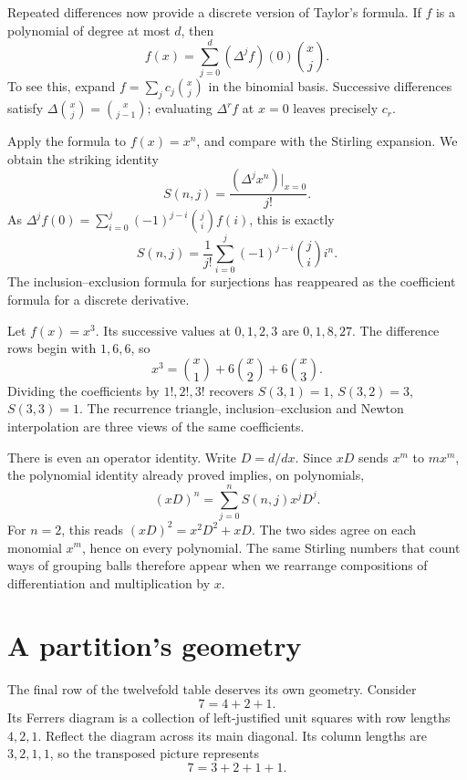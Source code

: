 Repeated differences now provide a discrete version of Taylor's formula. If \(f\) is a polynomial of degree at most \(d\), then
\[
 \boxed{f(x)=\sum_{j=0}^d(\Delta^jf)(0)\binom{x}{j}.}
\]
To see this, expand \(f=\sum_jc_j\binom{x}{j}\) in the binomial basis. Successive differences satisfy \(\Delta\binom{x}{j}=\binom{x}{j-1}\); evaluating \(\Delta^rf\) at \(x=0\) leaves precisely \(c_r\).

Apply the formula to \(f(x)=x^n\), and compare with the Stirling expansion. We obtain the striking identity
\[
 \boxed{S(n,j)=\frac{(\Delta^j x^n)|_{x=0}}{j!}.}
\]
As \(\Delta^j f(0)=\sum_{i=0}^j(-1)^{j-i}\binom ji f(i)\), this is exactly
\[
 S(n,j)=\frac1{j!}
 \sum_{i=0}^j(-1)^{j-i}\binom ji i^n.
\]
The inclusion--exclusion formula for surjections has reappeared as the coefficient formula for a discrete derivative.

\begin{example}
Let \(f(x)=x^3\). Its successive values at \(0,1,2,3\) are \(0,1,8,27\). The difference rows begin with \(1,6,6\), so
\[
 x^3=\binom{x}{1}+6\binom{x}{2}+6\binom{x}{3}.
\]
Dividing the coefficients by \(1!,2!,3!\) recovers \(S(3,1)=1\), \(S(3,2)=3\), \(S(3,3)=1\). The recurrence triangle, inclusion--exclusion and Newton interpolation are three views of the same coefficients.
\end{example}

There is even an operator identity. Write \(D=d/dx\). Since \(xD\) sends \(x^m\) to \(mx^m\), the polynomial identity already proved implies, on polynomials,
\[
 \boxed{(xD)^n=\sum_{j=0}^nS(n,j)x^jD^j.}
\]
For \(n=2\), this reads \((xD)^2=x^2D^2+xD\). The two sides agree on each monomial \(x^m\), hence on every polynomial. The same Stirling numbers that count ways of grouping balls therefore appear when we rearrange compositions of differentiation and multiplication by \(x\).

\section{A partition's geometry}

The final row of the twelvefold table deserves its own geometry. Consider
\[
 7=4+2+1.
\]
Its Ferrers diagram is a collection of left-justified unit squares with row lengths \(4,2,1\). Reflect the diagram across its main diagonal. Its column lengths are \(3,2,1,1\), so the transposed picture represents
\[
 7=3+2+1+1.
\]

